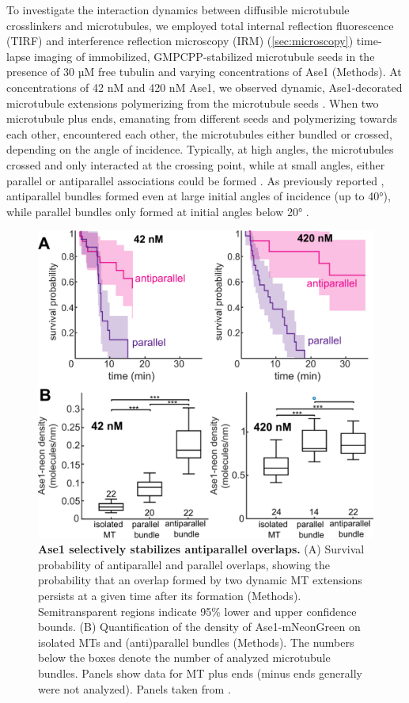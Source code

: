 To investigate the interaction dynamics between diffusible microtubule crosslinkers and microtubules, we employed total internal reflection fluorescence (TIRF) and interference reflection microscopy (IRM) (\autoref{sec:microscopy}) time-lapse imaging of immobilized, GMPCPP-stabilized microtubule seeds in the presence of 30 µM free tubulin and varying concentrations of Ase1 (Methods). At concentrations of 42 nM and 420 nM Ase1, we observed dynamic, Ase1-decorated microtubule extensions polymerizing from the microtubule seeds . When two microtubule plus ends, emanating from different seeds and polymerizing towards each other, encountered each other, the microtubules either bundled or crossed, depending on the angle of incidence. Typically, at high angles, the microtubules crossed and only interacted at the crossing point, while at small angles, either parallel or antiparallel associations could be formed . As previously reported \parencite{Janson2007}, antiparallel bundles formed even at large initial angles of incidence (up to 40°), while parallel bundles only formed at initial angles below 20° .\par
\begin{figure}
    \centering
    \includegraphics[width=1\linewidth]{Figures/ase1_1b.png}
    \caption[Ase1 selectively stabilizes antiparallel overlaps.]{
    \textbf{Ase1 selectively stabilizes antiparallel overlaps.} (A) Survival probability of antiparallel and parallel overlaps, showing the probability that an overlap formed by two dynamic MT extensions persists at a given time after its formation (Methods). Semitransparent regions indicate 95\% lower and upper confidence bounds. (B) Quantification of the density of Ase1-mNeonGreen on isolated MTs and (anti)parallel bundles (Methods). The numbers below the boxes denote the number of analyzed microtubule bundles. Panels show data for MT plus ends (minus ends generally were not analyzed). Panels taken from \cite{Krattenmacher2024}.
        }\label{ase1b}
\end{figure}
